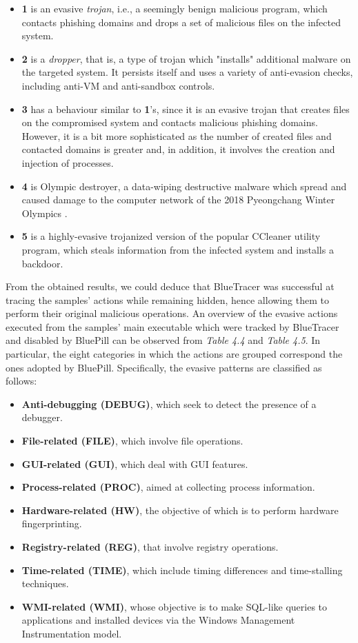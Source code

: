 \begin{itemize}
\item \textbf{1} is an evasive \textit{trojan}, i.e., a seemingly benign malicious program, which contacts phishing domains and drops a set of malicious files on the infected system.
\item \textbf{2} is a \textit{dropper}, that is, a type of trojan which "installs" additional malware on the targeted system. It persists itself and uses a variety of anti-evasion checks, including anti-VM and anti-sandbox controls. 
\item \textbf{3} has a behaviour similar to \textbf{1}'s, since it is an evasive trojan that creates files on the compromised system and contacts malicious phishing domains. However, it is a bit more sophisticated as the number of created files and contacted domains is greater and, in addition, it involves the creation and injection of processes.
\item \textbf{4} is Olympic destroyer, a data-wiping destructive malware which spread and caused damage to the computer network of the 2018 Pyeongchang Winter Olympics \cite{OlympicDestroyer}.  
\item \textbf{5} is a highly-evasive trojanized version of the popular CCleaner utility program, which steals information from the infected system and installs a backdoor.
\end{itemize}

From the obtained results, we could deduce that BlueTracer was successful at tracing the samples' actions while remaining hidden, hence allowing them to perform their original malicious operations. An overview of the evasive actions executed from the samples' main executable which were tracked by BlueTracer and disabled by BluePill can be observed from \textit{Table 4.4} and \textit{Table 4.5}. In particular, the eight categories in which the actions are grouped correspond the ones adopted by BluePill. Specifically, the evasive patterns are classified as follows:

\begin{itemize}
\item \textbf{Anti-debugging (DEBUG)}, which seek to detect the presence of a debugger.
\item \textbf{File-related (FILE)}, which involve file operations.
\item \textbf{GUI-related (GUI)}, which deal with GUI features.
\item \textbf{Process-related (PROC)}, aimed at collecting process information.
\item \textbf{Hardware-related (HW)}, the objective of which is to perform hardware fingerprinting.
\item \textbf{Registry-related (REG)}, that involve registry operations.
\item \textbf{Time-related (TIME)}, which include timing differences and time-stalling techniques.
\item \textbf{WMI-related (WMI)}, whose objective is to make SQL-like queries to applications and installed devices via the Windows Management Instrumentation model.
\end{itemize}  

